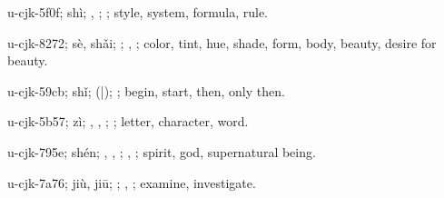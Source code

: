 \begin{multicols}{2}
{\cjkgGlue{}u-cjk-5f0f; shì; \cjkgGlue{}, \cjkgGlue{}; \cjkgGlue{}; style, system, formula, rule.

\cjkgGlue{}u-cjk-8272; sè, shǎi; \cjkgGlue{}; \cjkgGlue{}, \cjkgGlue{}; color, tint, hue, shade, form, body, beauty, desire for beauty.

\cjkgGlue{}u-cjk-59cb; shǐ; \cjkgGlue{}\cjkgGlue{}(\cjkgGlue{}|\cjkgGlue{}); \cjkgGlue{}; begin, start, then, only then.

\cjkgGlue{}u-cjk-5b57; zì; \cjkgGlue{}, \cjkgGlue{}, \cjkgGlue{}; \cjkgGlue{}; letter, character, word.

\cjkgGlue{}u-cjk-795e; shén; \cjkgGlue{}, \cjkgGlue{}, \cjkgGlue{}; \cjkgGlue{}, \cjkgGlue{}; spirit, god, supernatural being.

\cjkgGlue{}u-cjk-7a76; jiù, jiū; \cjkgGlue{}\cjkgGlue{}\cjkgGlue{}; \cjkgGlue{}, \cjkgGlue{}; examine, investigate.

}
\end{multicols}

